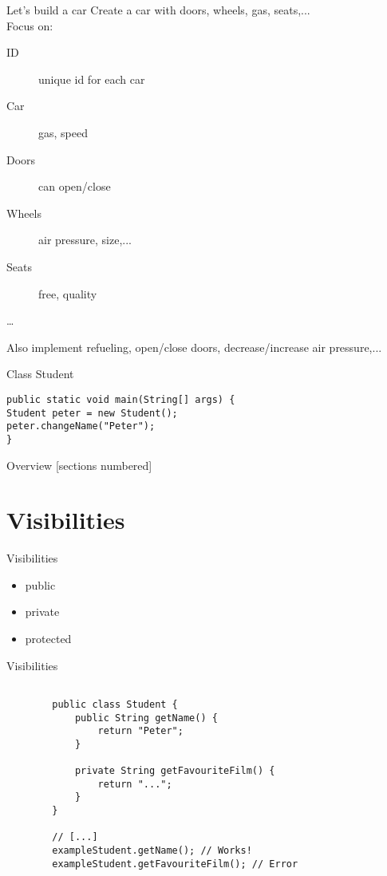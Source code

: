 \begin{frame}{Let's build a car}
Create a car with doors, wheels, gas, seats,... \\
\vspace{1em}
Focus on:
\begin{description}
	\item[ID] unique id for each car
	\item[Car] gas, speed
	\item[Doors] can open/close
	\item[Wheels] air pressure, size,...
	\item[Seats] free, quality
	\item[\dots]
\end{description}
Also implement refueling, open/close doors, decrease/increase air pressure,...
\end{frame}


\begin{frame}[fragile]{Class Student}
\begin{lstlisting}
public static void main(String[] args) {
Student peter = new Student();
peter.changeName("Peter");
}
\end{lstlisting}
\end{frame}

\begin{frame}
	\titlepage
\end{frame}
\begin{frame}{Overview}
	[sections numbered]
	\tableofcontents
\end{frame}

\section{Visibilities}
\begin{frame}[fragile]{Visibilities}
	\begin{itemize}
		\item public
		\item private
		\item protected
	\end{itemize}
\end{frame}
	
\begin{frame}[fragile]{Visibilities}

	\begin{lstlisting}
	
		public class Student {
			public String getName() {
				return "Peter";
			}
			
			private String getFavouriteFilm() {
				return "...";
			}
		}
	
		// [...]
		exampleStudent.getName(); // Works!
		exampleStudent.getFavouriteFilm(); // Error
	
	\end{lstlisting}
	
\end{frame}


